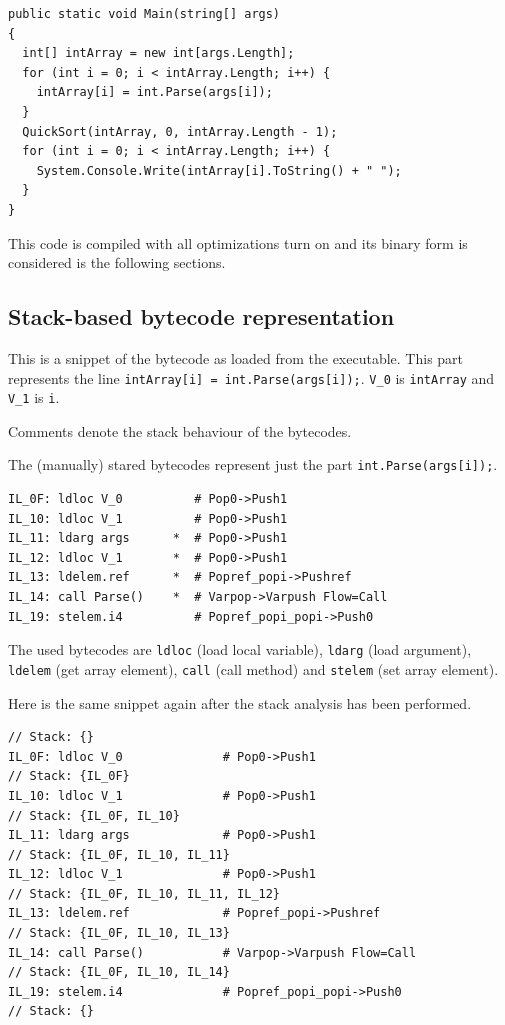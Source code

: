 \documentclass[12pt,twoside,notitlepage]{report}
\begin{document}
\begin{verbatim}
public static void Main(string[] args)
{
  int[] intArray = new int[args.Length];
  for (int i = 0; i < intArray.Length; i++) {
    intArray[i] = int.Parse(args[i]);
  }
  QuickSort(intArray, 0, intArray.Length - 1);
  for (int i = 0; i < intArray.Length; i++) {
    System.Console.Write(intArray[i].ToString() + " ");
  }
}
\end{verbatim}

This code is compiled with all optimizations turn on and its
binary form is considered is the following sections.

\subsection{Stack-based bytecode representation}

This is a snippet of the bytecode as loaded from the executable.  
This part represents the line \verb|intArray[i] = int.Parse(args[i]);|.
\verb|V_0| is \verb|intArray| and \verb|V_1| is \verb|i|.

Comments denote the stack behaviour of the bytecodes.

The (manually) stared bytecodes represent just the part
\verb|int.Parse(args[i]);|.

\begin{verbatim}
IL_0F: ldloc V_0          # Pop0->Push1   
IL_10: ldloc V_1          # Pop0->Push1   
IL_11: ldarg args      *  # Pop0->Push1   
IL_12: ldloc V_1       *  # Pop0->Push1   
IL_13: ldelem.ref      *  # Popref_popi->Pushref   
IL_14: call Parse()    *  # Varpop->Varpush Flow=Call  
IL_19: stelem.i4          # Popref_popi_popi->Push0   
\end{verbatim}

The used bytecodes are \verb|ldloc| (load local variable),
\verb|ldarg| (load argument), \verb|ldelem| (get array element),
\verb|call| (call method) and \verb|stelem| (set array element).

Here is the same snippet again after the stack analysis
has been performed.

\begin{verbatim}
// Stack: {}
IL_0F: ldloc V_0              # Pop0->Push1  
// Stack: {IL_0F}
IL_10: ldloc V_1              # Pop0->Push1  
// Stack: {IL_0F, IL_10}
IL_11: ldarg args             # Pop0->Push1  
// Stack: {IL_0F, IL_10, IL_11}
IL_12: ldloc V_1              # Pop0->Push1  
// Stack: {IL_0F, IL_10, IL_11, IL_12}
IL_13: ldelem.ref             # Popref_popi->Pushref  
// Stack: {IL_0F, IL_10, IL_13}
IL_14: call Parse()           # Varpop->Varpush Flow=Call 
// Stack: {IL_0F, IL_10, IL_14}
IL_19: stelem.i4              # Popref_popi_popi->Push0  
// Stack: {}
\end{verbatim}
\end{document}
